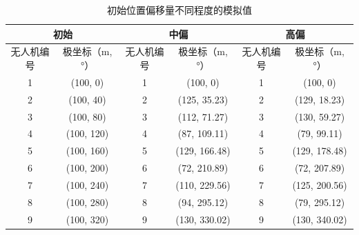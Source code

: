 \documentclass[withoutpreface,bwprint]{cumcmthesis} %
\begin{document}
\begin{table}[H]
    \caption{初始位置偏移量不同程度的模拟值}\label{tab:sim} 
    \centering
    \begin{tabular}{cc|cc|cc}
        \toprule[1.5pt]
\multicolumn{2}{c}{\textbf{初始}} & \multicolumn{2}{c}{\textbf{中偏}} & \multicolumn{2}{c}{\textbf{高偏}} \\
        \midrule[1pt]
无人机编号   & 极坐标（m,   °）  & 无人机编号  & 极坐标（m,   °）   & 无人机编号  & 极坐标（m,   °）   \\
1       & (100, 0)     & 1      & (100, 0)      & 1      & (100, 0)      \\
2       & (100, 40)    & 2      & (125, 35.23)  & 2      & (129, 18.23)  \\
3       & (100, 80)    & 3      & (112, 71.27)  & 3      & (130, 59.27)  \\
4       & (100, 120)   & 4      & (87, 109.11)  & 4      & (79, 99.11)   \\
5       & (100, 160)   & 5      & (129, 166.48) & 5      & (129, 178.48) \\
6       & (100, 200)   & 6      & (72, 210.89)  & 6      & (72, 207.89)  \\
7       & (100, 240)   & 7      & (110, 229.56) & 7      & (125, 200.56) \\
8       & (100, 280)   & 8      & (94, 295.12)  & 8      & (79, 295.12)  \\
9       & (100, 320)   & 9      & (130, 330.02) & 9      & (130, 340.02) \\
        \bottomrule[1.5pt]
    \end{tabular}
\end{table}
\end{document}
